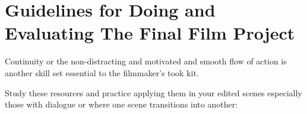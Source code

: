 \documentclass[
]{book}
\begin{document}
\hypertarget{guidelines-for-doing-and-evaluating-the-final-film-project}{%
\section*{Guidelines for Doing and Evaluating The Final Film Project}\label{guidelines-for-doing-and-evaluating-the-final-film-project}}

Continuity or the non-distracting and motivated and smooth flow of action is another skill set essential to the filmmaker's took kit.

Study these resources and practice applying them in your edited scenes especially those with dialogue or where one scene transitions into another:
\end{document}
